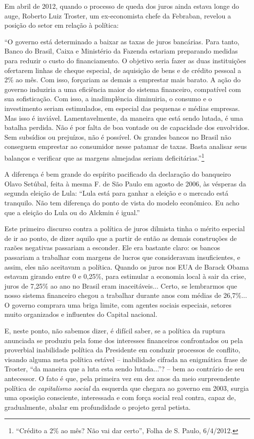 Em abril de 2012, quando o processo de queda dos juros ainda estava
longe do auge, Roberto Luiz Troster, um ex-economista chefe da Febraban,
revelou a posição do setor em relação à política:

``O governo está determinado a baixar as taxas de juros bancárias. Para
tanto, Banco do Brasil, Caixa e Ministério da Fazenda estariam
preparando medidas para reduzir o custo do financiamento. O objetivo
seria fazer as duas instituições ofertarem linhas de cheque especial, de
aquisição de bens e de crédito pessoal a 2\% ao mês. Com isso, forçariam
as demais a emprestar mais barato. A ação do governo induziria a uma
eficiência maior do sistema financeiro, compatível com sua sofisticação.
Com isso, a inadimplência diminuiria, o consumo e o investimento seriam
estimulados, em especial das pequenas e médias empresas. Mas isso é
inviável. Lamentavelmente, da maneira que está sendo lutada, é uma
batalha perdida. Não é por falta de boa vontade ou de capacidade dos
envolvidos. Sem subsídios ou prejuízos, não é possível. Os grandes
bancos no Brasil não conseguem emprestar ao consumidor nesse patamar de
taxas. Basta analisar seus balanços e verificar que as margens almejadas
seriam deficitárias.''\footnote{``Crédito a 2\% ao mês? Não vai dar
  certo'', Folha de S. Paulo, 6/4/2012.}

A diferença é bem grande do espírito pacificado da declaração do
banqueiro Olavo Setúbal, feita à mesma F. de São Paulo em agosto de
2006, às vésperas da segunda eleição de Lula: ``Lula está para ganhar a
eleição e o mercado está tranquilo. Não tem diferença do ponto de vista
do modelo econômico. Eu acho que a eleição do Lula ou do Alckmin é
igual.''

Este primeiro discurso contra a política de juros dilmista tinha o
mérito especial de ir ao ponto, de dizer aquilo que a partir de então as
demais construções de razões negativas passariam a esconder. Ele era
bastante claro: os bancos passariam a trabalhar com margens de lucros
que consideravam insuficientes, e assim, eles não aceitavam a política.
Quando os juros nos EUA de Barack Obama estavam girando entre 0 e
0,25\%, para estimular a economia local à sair da crise, juros de 7,25\%
ao ano no Brasil eram inaceitáveis... Certo, se lembrarmos que nosso
sistema financeiro chegou a trabalhar durante anos com médias de
26,7\%... O governo comprara uma briga limite, com agentes sociais
especiais, setores muito organizados e influentes do Capital nacional.

E, neste ponto, não sabemos dizer, é difícil saber, se a política da
ruptura anunciada se produziu pela fome dos interesses financeiros
confrontados ou pela proverbial inabilidade política da Presidente em
conduzir processos de conflito, visando alguma meta política estável --
inabilidade cifrada na enigmática frase de Troster, ``da maneira que a
luta esta sendo lutada...''? -- bem ao contrário de seu antecessor. O
fato é que, pela primeira vez em dez anos da meio surpreendente política
de \emph{capitalismo social} da esquerda que chegara ao governo em 2003,
surgia uma oposição consciente, interessada e com força social real
contra, capaz de, gradualmente, abalar em profundidade o projeto geral
petista.

